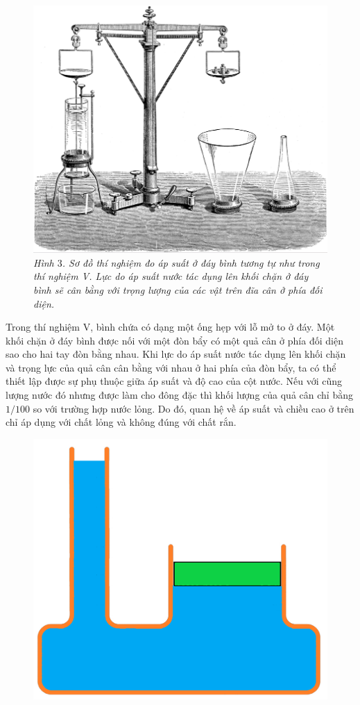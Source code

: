 \begin{multicols}{2}
	\begin{figure}[H]
		\vspace*{-10pt}
		\centering
		\captionsetup{labelformat= empty, justification=centering}
		\includegraphics[width= 0.85\linewidth]{4}
		\caption{\small\textit{\color{timhieukhoahoc}Hình $3$. Sơ đồ thí nghiệm đo áp suất ở đáy bình tương tự như trong thí nghiệm V. Lực do áp suất nước tác dụng lên khối chặn ở đáy bình sẽ cân bằng với trọng lượng của các vật trên đĩa cân ở phía đối diện.}}
		\vspace*{-5pt}
	\end{figure}
	Trong thí nghiệm V, bình chứa có dạng một ống hẹp với lỗ mở to ở đáy. Một khối chặn ở đáy bình được nối với một đòn bẩy có một quả cân ở phía đối diện sao cho hai tay đòn bằng nhau. Khi lực do áp suất nước tác dụng lên khối chặn và trọng lực của quả cân cân bằng với nhau ở hai phía của đòn bẩy, ta có thể thiết lập được sự phụ thuộc giữa áp suất và độ cao của cột nước. Nếu với cũng lượng nước đó nhưng được làm cho đông đặc thì khối lượng của quả cân chỉ bằng $1/100$ so với trường hợp nước lỏng. Do đó, quan hệ về áp suất và chiều cao ở trên chỉ áp dụng với chất lỏng và không đúng với chất rắn.
	\begin{figure}[H]
		\vspace*{-5pt}
		\centering
		\captionsetup{labelformat= empty, justification=centering}
		\includegraphics[width= 0.8\linewidth]{5}

\end{figure}
\end{multicols}
